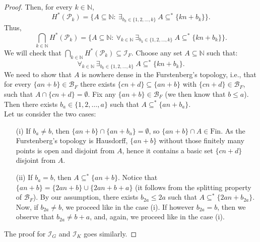 \documentclass{amsart}
\theoremstyle{definition}
\theoremstyle{definition}
\newcommand{\N}{{\mathbb N}}
\newcommand{\Fin}{\textrm{Fin}}
\newcommand{\I}{\mathcal I}
\newcommand{\B}{\mathcal{B}}
\begin{document}
\begin{proof}
Then, for every $k\in\N$, 
$$H^{*}(\mathcal{P}_k)= \{A\subseteq\N :\ \exists_{b_k\in\{1,2,\ldots,k\}}\ A\subseteq^* \{kn+b_k\}\}.$$
Thus,
$$\bigcap_{k\in\N}{H^{*}(\mathcal{P}_k)}= \{A\subseteq\N :\ \forall_{k\in\N}\ \exists_{b_k\in\{1,2,\ldots,k\}}\ A\subseteq^* \{kn+b_k\}\}.$$
We will check that $\bigcap_{k\in\N}{H^{*}(\mathcal{P}_k)}\subseteq\I_F$. Choose any set $A\subseteq\N$ such that: 
$$\forall_{k\in\N}\ \exists_{b_k\in\{1,2,\ldots,k\}}\ A\subseteq^* \{kn+b_k\}.$$ 
We need to show that $A$ is nowhere dense in the Furstenberg's topology, i.e., that for every $\{an+b\}\in \B_F$ there exists $\{cn+d\}\subseteq \{an+b\}$ with $\{cn+d\}\in \B_F$, such that $A\cap \{cn+d\} = \emptyset$. Fix any $\{an+b\}\in \B_F$ (we then know that $b\leq a$). Then there exists $b_a\in\{1,2,\ldots,a\}$ such that $A\subseteq^* \{an+b_a\}$.\\ 
Let us consider the two cases:
\begin{itemize}
	\item[(i)] If $b_a\neq b$, then $\{an+b\} \cap \{an+b_a\} = \emptyset$, so $\{an+b\}\cap A \in\Fin$. 
	As the Furstenberg's topology is Hausdorff, $\{an+b\}$ without those finitely many points is open and disjoint from $A$, hence it contains a basic set $\{cn+d\}$ disjoint from $A$. 
	\item[(ii)] If $b_a = b$, then $A\subseteq^* \{an+b\}$. Notice that $\{an+b\}=\{2an+b\}\cup \{2an+b+a\}$ (it follows from the splitting property of $\B_F$). By our assumption, there exists $b_{2a}\leq 2a$ such that $A\subseteq^* \{2an+b_{2a}\}$. Now, if $b_{2a} \neq b$, we proceed like in the case (i). If however $b_{2a}=b$, then we observe that $b_{2a}\neq b+a$, and, again, we proceed like in the case (i).
\end{itemize}

The proof for $\I_G$ and $\I_K$ goes similarly.
\end{proof}
\end{document}
